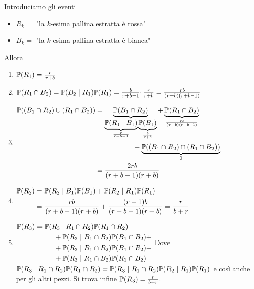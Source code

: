\Soluzione

\Soluzione

\Soluzione

Introduciamo gli eventi
\begin{itemize}
	\item $R_{k} =$ "la $k$-esima pallina estratta è rossa"
	\item $B_{k} =$ "la $k$-esima pallina estratta è bianca"
\end{itemize}
Allora
\begin{enumerate}
	\item $\mathbb{P}( R_{1}) =\frac{r}{r+b}$
	\item $\mathbb{P}( R_{1} \cap B_{2}) =\mathbb{P}( B_{2} \mid R_{1})\mathbb{P}( R_{1}) =\frac{b}{r+b-1} \cdotp \frac{r}{r+b} =\frac{rb}{( r+b)( r+b-1)}$
	\item $
	\begin{aligned}
		\mathbb{P}(( B_{1} \cap R_{2}) \cup ( R_{1} \cap B_{2})) & =\underbrace{\mathbb{P}( B_{1} \cap R_{2})}_{\underbrace{\mathbb{P}( R_{1} \mid B_{1})}_{\frac{r}{r+b-1}}\underbrace{\mathbb{P}( B_{1})}_{\frac{b}{r+b}}} +\underbrace{\mathbb{P}( R_{1} \cap B_{2})}_{\frac{rb}{( r+b)( r+b-1)}}\\
		 & \ \ \ \ \ \ \ \ \ \ \ \ \ \ \ \ -\underbrace{\mathbb{P}(( B_{1} \cap R_{2}) \cap ( R_{1} \cap B_{2}))}_{0}\\
		 & =\frac{2rb}{( r+b-1)( r+b)}
	\end{aligned}$
	\item $
	\begin{aligned}
		\mathbb{P}( R_{2}) & =\mathbb{P}( R_{2} \mid B_{1})\mathbb{P}( B_{1}) +\mathbb{P}( R_{2} \mid R_{1})\mathbb{P}( R_{1})\\
		 & =\frac{rb}{( r+b-1)( r+b)} +\frac{( r-1) b}{( r+b-1)( r+b)} =\frac{r}{b+r}
	\end{aligned}$
	\item $
	\begin{aligned}
		\mathbb{P}( R_{3}) & =\mathbb{P}( R_{3} \mid R_{1} \cap R_{2})\mathbb{P}( R_{1} \cap R_{2}) +\\
		 & \ \ \ \ \ \ \ \ +\mathbb{P}( R_{3} \mid B_{1} \cap B_{2})\mathbb{P}( B_{1} \cap B_{2}) +\\
		 & \ \ \ \ \ \ \ \ +\mathbb{P}( R_{3} \mid B_{1} \cap R_{2})\mathbb{P}( B_{1} \cap R_{2}) +\\
		 & \ \ \ \ \ \ \ \ +\mathbb{P}( R_{3} \mid R_{1} \cap B_{2})\mathbb{P}( R_{1} \cap B_{2})
	\end{aligned}$
	Dove $\mathbb{P}( R_{3} \mid R_{1} \cap R_{2})\mathbb{P}( R_{1} \cap R_{2}) =\mathbb{P}( R_{3} \mid R_{1} \cap R_{2})\mathbb{P}( R_{2} \mid R_{1})\mathbb{P}( R_{1})$ e così anche per gli altri pezzi. Si trova infine $\mathbb{P}( R_{3}) =\frac{r}{b+r}$.
\end{enumerate}

